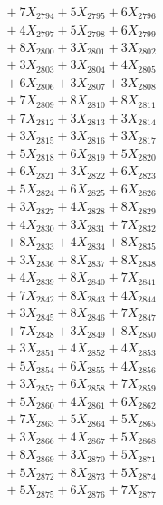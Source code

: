 \documentclass[a4paper,10pt]{article}
\begin{document}
{\begin{align}
&\;  + 7 X_{2794} + 5 X_{2795} + 6 X_{2796} \\[0.3ex]
&\;  + 4 X_{2797} + 5 X_{2798} + 6 X_{2799} \\[0.5ex]\allowbreak
&\;  + 8 X_{2800} + 3 X_{2801} + 3 X_{2802} \\[0.3ex]
&\;  + 3 X_{2803} + 3 X_{2804} + 4 X_{2805} \\[0.3ex]
&\;  + 6 X_{2806} + 3 X_{2807} + 3 X_{2808} \\[0.3ex]
&\;  + 7 X_{2809} + 8 X_{2810} + 8 X_{2811} \\[0.3ex]
&\;  + 7 X_{2812} + 3 X_{2813} + 3 X_{2814} \\[0.3ex]
&\;  + 3 X_{2815} + 3 X_{2816} + 3 X_{2817} \\[0.3ex]
&\;  + 5 X_{2818} + 6 X_{2819} + 5 X_{2820} \\[0.3ex]
&\;  + 6 X_{2821} + 3 X_{2822} + 6 X_{2823} \\[0.3ex]
&\;  + 5 X_{2824} + 6 X_{2825} + 6 X_{2826} \\[0.3ex]
&\;  + 3 X_{2827} + 4 X_{2828} + 8 X_{2829} \\[0.5ex]\allowbreak
&\;  + 4 X_{2830} + 3 X_{2831} + 7 X_{2832} \\[0.3ex]
&\;  + 8 X_{2833} + 4 X_{2834} + 8 X_{2835} \\[0.3ex]
&\;  + 3 X_{2836} + 8 X_{2837} + 8 X_{2838} \\[0.3ex]
&\;  + 4 X_{2839} + 8 X_{2840} + 7 X_{2841} \\[0.3ex]
&\;  + 7 X_{2842} + 8 X_{2843} + 4 X_{2844} \\[0.3ex]
&\;  + 3 X_{2845} + 8 X_{2846} + 7 X_{2847} \\[0.3ex]
&\;  + 7 X_{2848} + 3 X_{2849} + 8 X_{2850} \\[0.3ex]
&\;  + 3 X_{2851} + 4 X_{2852} + 4 X_{2853} \\[0.3ex]
&\;  + 5 X_{2854} + 6 X_{2855} + 4 X_{2856} \\[0.3ex]
&\;  + 3 X_{2857} + 6 X_{2858} + 7 X_{2859} \\[0.5ex]\allowbreak
&\;  + 5 X_{2860} + 4 X_{2861} + 6 X_{2862} \\[0.3ex]
&\;  + 7 X_{2863} + 5 X_{2864} + 5 X_{2865} \\[0.3ex]
&\;  + 3 X_{2866} + 4 X_{2867} + 5 X_{2868} \\[0.3ex]
&\;  + 8 X_{2869} + 3 X_{2870} + 5 X_{2871} \\[0.3ex]
&\;  + 5 X_{2872} + 8 X_{2873} + 5 X_{2874} \\[0.3ex]
&\;  + 5 X_{2875} + 6 X_{2876} + 7 X_{2877} \\[0.3ex]

\end{align}}
\end{document}
